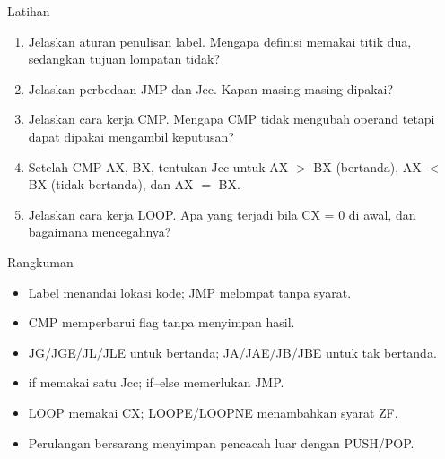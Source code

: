 \documentclass[aspectratio=169,11pt]{beamer}
\begin{document}
\begin{frame}{Latihan}
\small
\begin{enumerate}
    \item Jelaskan aturan penulisan label. Mengapa definisi memakai
          titik dua, sedangkan tujuan lompatan tidak?

    \vspace{0.15em}
    \item Jelaskan perbedaan JMP dan Jcc. Kapan masing-masing
          dipakai?

    \vspace{0.15em}
    \item Jelaskan cara kerja CMP. Mengapa CMP tidak mengubah operand
          tetapi dapat dipakai mengambil keputusan?

    \vspace{0.15em}
    \item Setelah CMP AX, BX, tentukan Jcc untuk AX $>$ BX
          (bertanda), AX $<$ BX (tidak bertanda), dan AX $=$ BX.

    \vspace{0.15em}
    \item Jelaskan cara kerja LOOP. Apa yang terjadi bila CX = 0 di
          awal, dan bagaimana mencegahnya?
\end{enumerate}
\end{frame}

\begin{frame}{Rangkuman}
\small
\begin{itemize}
    \item Label menandai lokasi kode; JMP melompat tanpa syarat.

    \vspace{0.15em}
    \item CMP memperbarui flag tanpa menyimpan hasil.

    \vspace{0.15em}
    \item JG/JGE/JL/JLE untuk bertanda; JA/JAE/JB/JBE untuk tak
          bertanda.

    \vspace{0.15em}
    \item if memakai satu Jcc; if--else memerlukan JMP.

    \vspace{0.15em}
    \item LOOP memakai CX; LOOPE/LOOPNE menambahkan syarat ZF.

    \vspace{0.15em}
    \item Perulangan bersarang menyimpan pencacah luar dengan
          PUSH/POP.
\end{itemize}
\end{frame}
\end{document}
